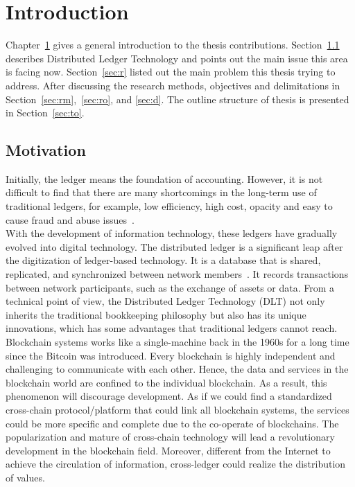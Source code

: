 \chapter{Introduction}
\label{chap:1}
\noindent Chapter~\ref{chap:1} gives a general introduction to the thesis contributions. Section~\ref{sec:m} describes Distributed Ledger Technology and points out the main issue this area is facing now. Section~\ref{sec:r} listed out the main problem this thesis trying to address. After discussing the research methods, objectives and delimitations in Section~\ref{sec:rm},~\ref{sec:ro}, and \ref{sec:d}. The outline structure of thesis is presented in Section~\ref{sec:to}. 
\section{Motivation}
\label{sec:m}

\noindent Initially, the ledger means the foundation of accounting. However, it is not difficult to find that there are many shortcomings in the long-term use of traditional ledgers, for example, low efficiency, high cost, opacity and easy to cause fraud and abuse issues~\cite{versus}.\\

\noindent With the development of information technology, these ledgers have gradually evolved into digital technology. The distributed ledger is a significant leap after the digitization of ledger-based technology. It is a database that is shared, replicated, and synchronized between network members~\cite{brakeville2016blockchain}. It records transactions between network participants, such as the exchange of assets or data. From a technical point of view, the Distributed Ledger Technology (DLT) not only inherits the traditional bookkeeping philosophy but also has its unique innovations, which has some advantages that traditional ledgers cannot reach.\\

\noindent Blockchain systems works like a single-machine back in the 1960s for a long time since the Bitcoin was introduced. Every blockchain is highly independent and challenging to communicate with each other. Hence, the data and services in the blockchain world are confined to the individual blockchain. As a result, this phenomenon will discourage development. As if we could find a standardized cross-chain protocol/platform that could link all blockchain systems, the services could be more specific and complete due to the co-operate of blockchains. The popularization and mature of cross-chain technology will lead a revolutionary development in the blockchain field. Moreover, different from the Internet to achieve the circulation of information, cross-ledger could realize the distribution of values.\\

